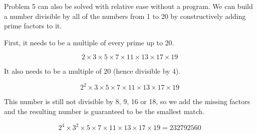 \documentclass{article}
\begin{document}
Problem 5 can also be solved with relative ease without a program. We can build a number
divisible by all of the numbers from 1 to 20 by constructively adding prime factors to it.

First, it needs to be a multiple of every prime up to 20.

	\[ 2 \times 3 \times 5 \times 7 \times 11 \times 13 \times 17 \times 19 \]

It also needs to be a multiple of 20 (hence divisible by 4).

	\[ 2^2 \times 3 \times 5 \times 7 \times 11 \times 13 \times 17 \times 19 \]

This number is still not divisible by 8, 9, 16 or 18, so we add the missing factors and the resulting number is guaranteed to be the smallest match.

	\[ 2^4 \times 3^2 \times 5 \times 7 \times 11 \times 13 \times 17 \times 19 = 232792560\]
\end{document}
